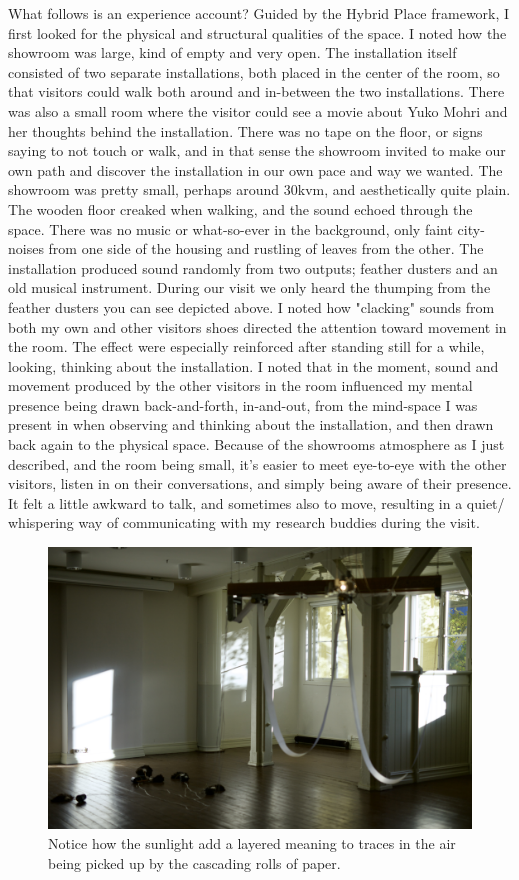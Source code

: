 What follows is an experience account?
Guided by the Hybrid Place framework, I first looked for the physical and structural qualities of the space. I noted how the showroom was large, kind of empty and very open. The installation itself consisted of two separate installations, both placed in the center of the room, so that visitors could walk both around and in-between the two installations. There was also a small room where the visitor could see a movie about Yuko Mohri and her thoughts behind the installation. There was no tape on the floor, or signs saying to not touch or walk, and in that sense the showroom invited to make our own path and discover the installation in our own pace and way we wanted. The showroom was pretty small, perhaps around 30kvm, and aesthetically quite plain. The wooden floor creaked when walking, and the sound echoed through the space. There was no music or what-so-ever in the background, only faint city-noises from one side of the housing and rustling of leaves from the other. The installation produced sound randomly from two outputs; feather dusters and an old musical instrument. During our visit we only heard the thumping from the feather dusters you can see depicted above. I noted how "clacking" sounds from both my own and other visitors shoes directed the attention toward movement in the room. The effect were especially reinforced after standing still for a while, looking, thinking about the installation. I noted that in the moment, sound and movement produced by the other visitors in the room influenced my mental presence being drawn back-and-forth, in-and-out, from the mind-space I was present in when observing and thinking about the installation, and then drawn back again to the physical space. Because of the showrooms atmosphere as I just described, and the room being small, it's easier to meet eye-to-eye with the other visitors, listen in on their conversations, and simply being aware of their presence. It felt a little awkward to talk, and sometimes also to move, resulting in a quiet/ whispering way of communicating with my research buddies during the visit.

\begin{figure}[h]
    \includegraphics[width=12cm]{pictures/process/yuko_harmony.jpeg}
    \centering 
    \caption{Notice how the sunlight add a layered meaning to traces in the air being picked up by the cascading rolls of paper.}
\end{figure}

